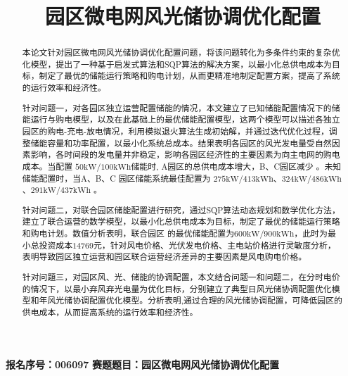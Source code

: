 \documentclass{cumcmthesis}
\title{园区微电网风光储协调优化配置}
\begin{document}

\thispagestyle{empty} %
\begin{center}  
    \vspace*{\fill} %
    {\Large\bfseries 报名序号：006097}  
    \vskip 1cm %
    {\Large\bfseries 赛题题目：园区微电网风光储协调优化配置}  
    \vspace*{\fill} %
\end{center}  
  
\clearpage %



	\setcounter{page}{1}
 \begin{abstract}
本论文针对园区微电网风光储协调优化配置问题，将该问题转化为多条件约束的复杂优化模型，提出了一种基于启发式算法和SQP算法的解决方案，以最小化总供电成本为目标，制定了最优的储能运行策略和购电计划，从而更精准地制定配置方案，提高了系统的运行效率和经济性。

针对问题一，对各园区独立运营配置储能的情况，本文建立了已知储能配置情况下的储能运行与购电模型，以及在此基础上的最优储能配置模型，这两个模型可以描述各独立园区的购电-充电-放电情况，利用模拟退火算法生成初始解，并通过迭代优化过程，调整储能容量和功率配置，以最小化系统总成本。结果表明各园区的风光发电量受自然因素影响，各时间段的发电量并非稳定，影响各园区经济性的主要因素为向主电网的购电成本。当配置 $50 \mathrm{kW} / 100 \mathrm{kWh}$储能时, A园区的总供电成本增大，B、C园区减少 。未知储能配置时，当A、B、C 园区储能系统最佳配置为 $275 \mathrm{kW} / 413 \mathrm{kWh}$、$324 \mathrm{kW} / 486 \mathrm{kWh}$、$291 \mathrm{kW} / 437 \mathrm{kWh}$ 。

针对问题二，对联合园区储能配置进行研究，通过SQP算法动态规划和数学优化方法，建立了联合运营的数学模型，以最小化总供电成本为目标，制定了最优的储能运行策略和购电计划。数值分析表明，联合园区
的最优储能配置为$600 \mathrm{kW} / 900 \mathrm{kWh}$，此时为最小总投资成本$14769$元，针对风电价格、光伏发电价格、主电站价格进行灵敏度分析，表明导致园区独立运营和园区联合运营经济差异的主要因素是风电购电价格。

针对问題三，对园区风、光、储能的协调配置，本文结合问题一和问题二，在分时电价的情况下，以最小弃风弃光电量为优化目标，分别建立了典型日风光储协调配置优化模型和年风光储协调配置优化模型。分析表明,通过合理的风光储协调配置，可降低园区的供电成本，从而提高系统的运行效率和经济性。

\vspace{5cm}


\end{abstract}
\pagestyle{plain}
\fancyfoot[C]{\thepage}
\end{document}
